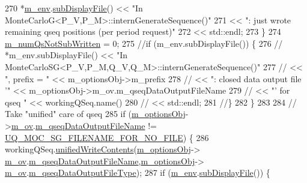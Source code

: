 \begin{DoxyCode}
270       *\hyperlink{class_q_u_e_s_o_1_1_monte_carlo_s_g_a30055a359b22cde54681679aed8ae6e7}{m\_env}.\hyperlink{class_q_u_e_s_o_1_1_base_environment_a8a0064746ae8dddfece4229b9ad374d6}{subDisplayFile}() << \textcolor{stringliteral}{"In MonteCarloG<P\_V,P\_M>::internGenerateSequence()"}
271                               << \textcolor{stringliteral}{": just wrote remaining qseq positions (per period request)"}
272                               << std::endl;
273     \}
274     \hyperlink{class_q_u_e_s_o_1_1_monte_carlo_s_g_af1d99dc1a3384fd294da7464ba1bda5f}{m\_numQsNotSubWritten} = 0;
275     \textcolor{comment}{//if (m\_env.subDisplayFile()) \{}
276     \textcolor{comment}{//  *m\_env.subDisplayFile() << "In MonteCarloSG<P\_V,P\_M,Q\_V,Q\_M>::internGenerateSequence()"}
277     \textcolor{comment}{//                          << ", prefix = "                 << m\_optionsObj->m\_prefix}
278     \textcolor{comment}{//                          << ": closed data output file '" <<
       m\_optionsObj->m\_ov.m\_qseqDataOutputFileName}
279     \textcolor{comment}{//                          << "' for qseq "                 << workingQSeq.name()}
280     \textcolor{comment}{//                          << std::endl;}
281     \textcolor{comment}{//\}}
282   \}
283 
284   \textcolor{comment}{// Take "unified" care of qseq}
285   \textcolor{keywordflow}{if} (\hyperlink{class_q_u_e_s_o_1_1_monte_carlo_s_g_acf7ce935648fd3a5d0ee23685708b4ca}{m\_optionsObj}->\hyperlink{class_q_u_e_s_o_1_1_monte_carlo_s_g_options_a4bc6849a41ede87425cad9ab6e97df11}{m\_ov}.\hyperlink{class_q_u_e_s_o_1_1_mc_options_values_a1c2a61e5c129ba0c4c2455b75709feee}{m\_qseqDataOutputFileName} != 
      \hyperlink{_monte_carlo_s_g_options_8h_a0c480f57c47ffbb3b11b838ba7734d15}{UQ\_MOC\_SG\_FILENAME\_FOR\_NO\_FILE}) \{
286     workingQSeq.\hyperlink{class_q_u_e_s_o_1_1_base_vector_sequence_a3987ee6d026842e4ddaeaf0bc850ef83}{unifiedWriteContents}(\hyperlink{class_q_u_e_s_o_1_1_monte_carlo_s_g_acf7ce935648fd3a5d0ee23685708b4ca}{m\_optionsObj}->
      \hyperlink{class_q_u_e_s_o_1_1_monte_carlo_s_g_options_a4bc6849a41ede87425cad9ab6e97df11}{m\_ov}.\hyperlink{class_q_u_e_s_o_1_1_mc_options_values_a1c2a61e5c129ba0c4c2455b75709feee}{m\_qseqDataOutputFileName},\hyperlink{class_q_u_e_s_o_1_1_monte_carlo_s_g_acf7ce935648fd3a5d0ee23685708b4ca}{m\_optionsObj}->
      \hyperlink{class_q_u_e_s_o_1_1_monte_carlo_s_g_options_a4bc6849a41ede87425cad9ab6e97df11}{m\_ov}.\hyperlink{class_q_u_e_s_o_1_1_mc_options_values_a4816ea4c0aef22cc5d2e9057ea44b73e}{m\_qseqDataOutputFileType});
287     \textcolor{keywordflow}{if} (\hyperlink{class_q_u_e_s_o_1_1_monte_carlo_s_g_a30055a359b22cde54681679aed8ae6e7}{m\_env}.\hyperlink{class_q_u_e_s_o_1_1_base_environment_a8a0064746ae8dddfece4229b9ad374d6}{subDisplayFile}()) \{

\end{DoxyCode}
